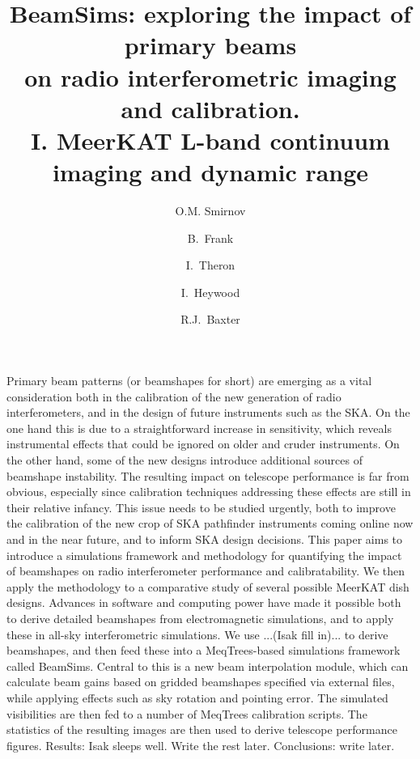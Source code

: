 \documentclass{aa}
\begin{document}
\title{BeamSims: exploring the impact of primary beams\\on radio interferometric imaging and calibration.\\I. MeerKAT L-band continuum imaging and dynamic range}

\author{O.M. Smirnov\inst{\ref{inst:astron}} \and B.\ Frank\inst{\ref{inst:uct-astro}} \and I.\ Theron\inst{\ref{inst:emss}} \and I.\ Heywood\inst{\ref{inst:oap}} \and R.J.\ Baxter\inst{\ref{inst:uct-cs}}}


\date{}



\abstract%
{Primary beam patterns (or beamshapes for short) are emerging as a vital consideration both in the calibration of the new generation of radio interferometers, and in the design of future instruments such as the SKA. On the one hand this is due to a straightforward increase in sensitivity, which reveals instrumental effects that could be ignored on older and cruder instruments. On the other hand, some of the new designs introduce additional sources of beamshape instability. The resulting impact on telescope performance is far from obvious, especially since calibration techniques addressing these effects are still in their relative infancy. This issue needs to be studied urgently, both to improve the calibration of the new crop of SKA pathfinder instruments coming online now and in the near future, and to inform SKA design decisions.}
{This paper aims to introduce a simulations framework and methodology for quantifying the impact of beamshapes on radio interferometer performance and calibratability. We then apply the methodology to a comparative study of several possible MeerKAT dish designs.}
{Advances in software and computing power have made it possible both to derive detailed beamshapes from electromagnetic simulations, and to apply these in all-sky interferometric simulations. We use ...(Isak fill in)... to derive beamshapes, and then feed these into a MeqTrees-based simulations framework called BeamSims. Central to this is a new beam interpolation module, which can calculate beam gains based on gridded beamshapes specified via external files, while
applying effects such as sky rotation and pointing error. The simulated visibilities are then fed to a number of MeqTrees calibration scripts. The statistics of the resulting images are then used to derive telescope performance figures.}
{Results: Isak sleeps well. Write the rest later.}
{Conclusions: write later.}
\end{document}
